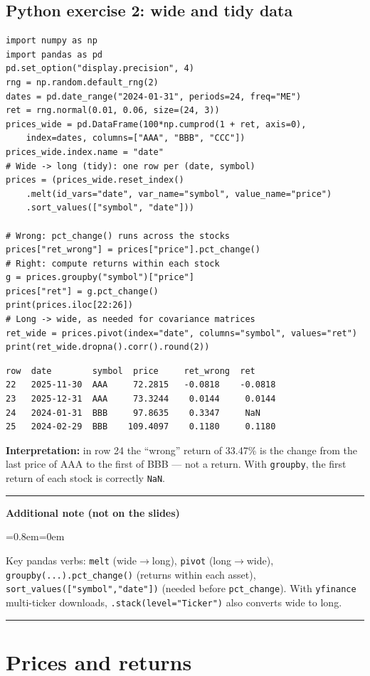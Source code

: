 \documentclass[11pt,a4paper]{report}
\newenvironment{notebox}[1]
  {\par\medskip\Needspace{6\baselineskip}\noindent\rule{\linewidth}{0.4pt}\par\nopagebreak
   \noindent\textbf{#1}\par\nopagebreak
   \begin{list}{}{\leftmargin=0.8em\rightmargin=0em\topsep=2pt}\item[]}
  {\end{list}\nopagebreak\noindent\rule{\linewidth}{0.4pt}\par\medskip}
\newenvironment{addnote}{\begin{notebox}{Additional note (not on the slides)}}{\end{notebox}}
\begin{document}
\subsection*{Python exercise 2: wide and tidy data}
\begin{lstlisting}
import numpy as np
import pandas as pd
pd.set_option("display.precision", 4)
rng = np.random.default_rng(2)
dates = pd.date_range("2024-01-31", periods=24, freq="ME")
ret = rng.normal(0.01, 0.06, size=(24, 3))
prices_wide = pd.DataFrame(100*np.cumprod(1 + ret, axis=0),
    index=dates, columns=["AAA", "BBB", "CCC"])
prices_wide.index.name = "date"
# Wide -> long (tidy): one row per (date, symbol)
prices = (prices_wide.reset_index()
    .melt(id_vars="date", var_name="symbol", value_name="price")
    .sort_values(["symbol", "date"]))

# Wrong: pct_change() runs across the stocks
prices["ret_wrong"] = prices["price"].pct_change()
# Right: compute returns within each stock
g = prices.groupby("symbol")["price"]
prices["ret"] = g.pct_change()
print(prices.iloc[22:26])
# Long -> wide, as needed for covariance matrices
ret_wide = prices.pivot(index="date", columns="symbol", values="ret")
print(ret_wide.dropna().corr().round(2))
\end{lstlisting}
\begin{lstlisting}[style=out]
row  date        symbol  price     ret_wrong  ret
22   2025-11-30  AAA     72.2815   -0.0818    -0.0818
23   2025-12-31  AAA     73.3244    0.0144     0.0144
24   2024-01-31  BBB     97.8635    0.3347     NaN
25   2024-02-29  BBB    109.4097    0.1180     0.1180
\end{lstlisting}
\textbf{Interpretation:} in row 24 the ``wrong'' return of 33.47\% is the change
from the last price of AAA to the first of BBB --- not a return. With
\texttt{groupby}, the first return of each stock is correctly \texttt{NaN}.

\begin{addnote}
Key pandas verbs: \texttt{melt} (wide$\to$long), \texttt{pivot}
(long$\to$wide), \texttt{groupby(...).pct\_change()} (returns within each
asset), \texttt{sort\_values(["symbol","date"])} (needed before
\texttt{pct\_change}). With \texttt{yfinance} multi-ticker downloads,
\texttt{.stack(level="Ticker")} also converts wide to long.
\end{addnote}

\section{Prices and returns}
\end{document}
